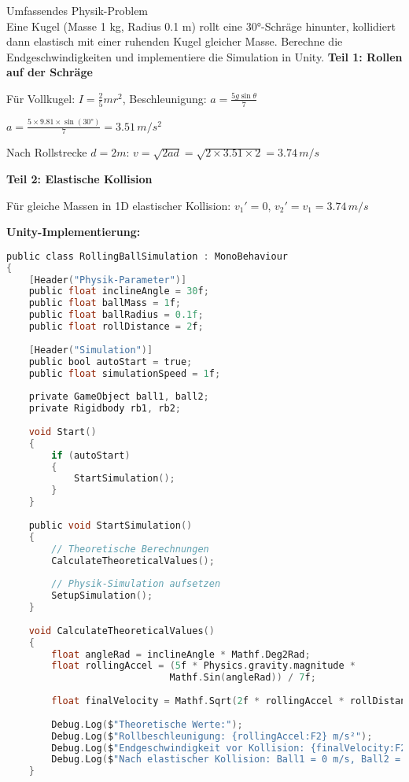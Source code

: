 \begin{example2}{Umfassendes Physik-Problem}\\
    Eine Kugel (Masse 1 kg, Radius 0.1 m) rollt eine 30°-Schräge hinunter, kollidiert dann elastisch mit einer ruhenden Kugel gleicher Masse. Berechne die Endgeschwindigkeiten und implementiere die Simulation in Unity.
    \tcblower
    \textbf{Teil 1: Rollen auf der Schräge}
    
    Für Vollkugel: $I = \frac{2}{5}mr^2$, Beschleunigung: $a = \frac{5g\sin\theta}{7}$
    
    $a = \frac{5 \times 9.81 \times \sin(30°)}{7} = 3.51 \, m/s^2$
    
    Nach Rollstrecke $d = 2m$: $v = \sqrt{2ad} = \sqrt{2 \times 3.51 \times 2} = 3.74 \, m/s$
    
    \textbf{Teil 2: Elastische Kollision}
    
    Für gleiche Massen in 1D elastischer Kollision:
    $v_1' = 0$, $v_2' = v_1 = 3.74 \, m/s$
    
    \textbf{Unity-Implementierung:}
\begin{lstlisting}[language=C, style=basesmol]
public class RollingBallSimulation : MonoBehaviour 
{
    [Header("Physik-Parameter")]
    public float inclineAngle = 30f;
    public float ballMass = 1f;
    public float ballRadius = 0.1f;
    public float rollDistance = 2f;
    
    [Header("Simulation")]
    public bool autoStart = true;
    public float simulationSpeed = 1f;
    
    private GameObject ball1, ball2;
    private Rigidbody rb1, rb2;
    
    void Start() 
    {
        if (autoStart) 
        {
            StartSimulation();
        }
    }
    
    public void StartSimulation() 
    {
        // Theoretische Berechnungen
        CalculateTheoreticalValues();
        
        // Physik-Simulation aufsetzen
        SetupSimulation();
    }
    
    void CalculateTheoreticalValues() 
    {
        float angleRad = inclineAngle * Mathf.Deg2Rad;
        float rollingAccel = (5f * Physics.gravity.magnitude * 
                             Mathf.Sin(angleRad)) / 7f;
        
        float finalVelocity = Mathf.Sqrt(2f * rollingAccel * rollDistance);
        
        Debug.Log($"Theoretische Werte:");
        Debug.Log($"Rollbeschleunigung: {rollingAccel:F2} m/s²");
        Debug.Log($"Endgeschwindigkeit vor Kollision: {finalVelocity:F2} m/s");
        Debug.Log($"Nach elastischer Kollision: Ball1 = 0 m/s, Ball2 = {finalVelocity:F2} m/s");
    }
    

\end{lstlisting}
\end{example2}
